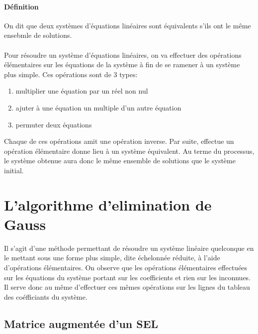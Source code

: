\paragraph{Définition} On dit que deux systèmes d'équations linéaires sont équivalents s'ils ont le même ensebmle de solutions.

\paragraph{} Pour résoudre un système d'équations linéaires, on va effectuer des opérations élémentaires sur les équations de la système à fin de se ramener à un système plus simple. Ces opérations sont de 3 types:
\begin{enumerate}[ a)]
  \item multiplier une équation par un réel non nul
  \item ajuter à une équation un multiple d'un autre équation
  \item permuter deux équations
\end{enumerate}

Chaque de ces opérations amit une opération inverse. Par suite, effectue un opération élémentaire donne lieu à un système équivalent. Au terme du processus, le système obtenue aura donc le même ensemble de solutions que le système initial.

%
%
\section{L'algorithme d'elimination de Gauss}
%
%
Il s'agit d'une méthode permettant de résoudre un système linéaire quelconque en le mettant sous une forme plus simple, dite échelonnée réduite, à l'aide d'opérations élémentaires.
On observe que les opérations élémentaires effectuées sur les équations du système portant sur les coefficients et rien sur les inconnues. Il serve donc au même d'effectuer ces mêmes opérations sur les lignes du tableau des coéfficiants du système.

%
\subsection{Matrice augmentée d'un SEL}
%
